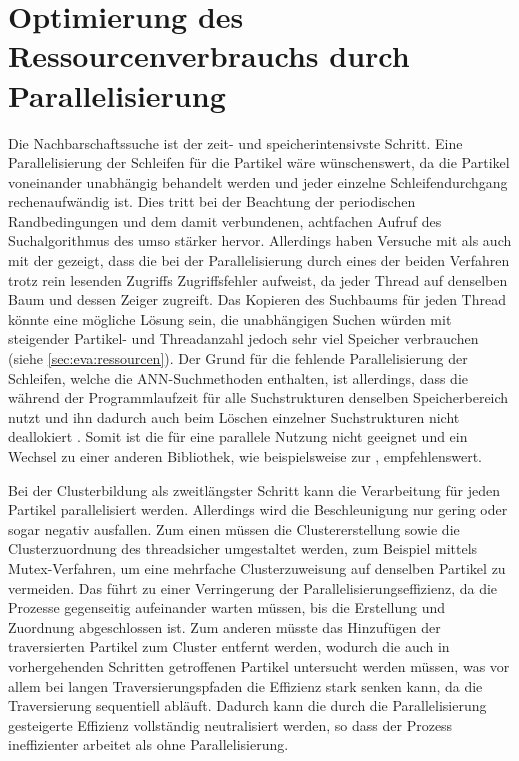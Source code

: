 \section{Optimierung des Ressourcenverbrauchs durch Parallelisierung}\label{sec:disc:optimierung-para}
Die Nachbarschaftssuche ist der zeit- und speicherintensivste Schritt. Eine Parallelisierung der Schleifen für die Partikel wäre wünschenswert, da die Partikel voneinander unabhängig behandelt werden und jeder einzelne Schleifendurchgang rechenaufwändig ist. Dies tritt bei der Beachtung der periodischen Randbedingungen und dem damit verbundenen, achtfachen Aufruf des Suchalgorithmus des  umso stärker hervor. Allerdings haben Versuche mit  als auch mit der \PPL gezeigt, dass die \ANN bei der Parallelisierung durch eines der beiden Verfahren trotz rein lesenden Zugriffs Zugriffsfehler aufweist, da jeder Thread auf denselben Baum und dessen Zeiger zugreift. Das Kopieren des Suchbaums für jeden Thread könnte eine mögliche Lösung sein, die unabhängigen Suchen würden mit steigender Partikel- und Threadanzahl jedoch sehr viel Speicher verbrauchen (siehe \autoref{sec:eva:ressourcen}).
Der Grund für die fehlende Parallelisierung der Schleifen, welche die \gls{ANN}-Suchmethoden enthalten, ist allerdings, dass die \ANN während der Programmlaufzeit für alle Suchstrukturen denselben Speicherbereich nutzt und ihn dadurch auch beim Löschen einzelner Suchstrukturen nicht deallokiert \cite[S.~8]{mount2010ann}. Somit ist die \ANN für eine parallele Nutzung nicht geeignet und ein Wechsel zu einer anderen Bibliothek, wie beispielsweise zur \FLANN \cite{ohara2013annAlgo} \cite{wijewardena2014annPerformance}, empfehlenswert.

Bei der Clusterbildung als zweitlängster Schritt kann die Verarbeitung für jeden Partikel parallelisiert werden. Allerdings wird die Beschleunigung nur gering oder sogar negativ ausfallen. Zum einen müssen die Clustererstellung sowie die Clusterzuordnung des  threadsicher umgestaltet werden, zum Beispiel mittels Mutex-Verfahren, um eine mehrfache Clusterzuweisung auf denselben Partikel zu vermeiden. Das führt zu einer Verringerung der Parallelisierungseffizienz, da die Prozesse gegenseitig aufeinander warten müssen, bis die Erstellung und Zuordnung abgeschlossen ist. Zum anderen müsste das Hinzufügen der traversierten Partikel zum Cluster entfernt werden, wodurch die auch in vorhergehenden Schritten getroffenen Partikel untersucht werden müssen, was vor allem bei langen Traversierungspfaden die Effizienz stark senken kann, da die Traversierung sequentiell abläuft. Dadurch kann die durch die Parallelisierung gesteigerte Effizienz vollständig neutralisiert werden, so dass der Prozess ineffizienter arbeitet als ohne Parallelisierung.

